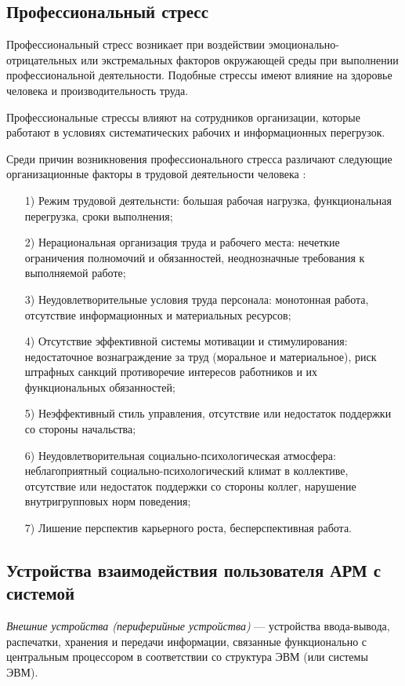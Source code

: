 \subsection{Профессиональный стресс}
Профессиональный стресс возникает при воздействии эмоционально-отрицательных или экстремальных факторов окружающей среды при выполнении профессиональной деятельности. Подобные стрессы имеют влияние на здоровье человека и производительность труда. \cite{professionalStress}

Профессиональные стрессы влияют на сотрудников организации, которые работают в условиях систематических рабочих и информационных перегрузок.

Среди причин возникновения профессионального стресса различают следующие организационные факторы в трудовой деятельности человека \cite{recognitionOfPsycho}:
\begin{itemize}[leftmargin=1.6\parindent]
\item[1)] Режим трудовой деятельнсти: большая рабочая нагрузка, функциональная перегрузка, сроки выполнения;
\item[2)] Нерациональная организация труда и рабочего места: нечеткие ограничения полномочий и обязанностей, неоднозначные требования к выполняемой работе;
\item[3)] Неудовлетворительные условия труда персонала: монотонная работа, отсутствие информационных и материальных ресурсов;
\item[4)] Отсутствие эффективной системы мотивации и стимулирования: недостаточное вознаграждение за труд (моральное и материальное), риск штрафных санкций противоречие интересов работников и их функциональных обязанностей;
\item[5)] Неэффективный стиль управления, отсутствие или недостаток поддержки со стороны начальства;
\item[6)] Неудовлетворительная социально-психологическая атмосфера: неблагоприятный социально-психологический климат в коллективе, отсутствие или недостаток поддержки со стороны коллег, нарушение внутригрупповых норм поведения;
\item[7)] Лишение перспектив карьерного роста, бесперспективная работа.
\end{itemize}


\subsection{Устройства взаимодействия пользователя АРМ с системой}
\textit{Внешние устройства (периферийные устройства)} --- устройства ввода-вывода, распечатки, хранения и передачи информации, связанные функционально с центральным процессором в соответствии со структура ЭВМ (или системы ЭВМ). \cite{encDic}

